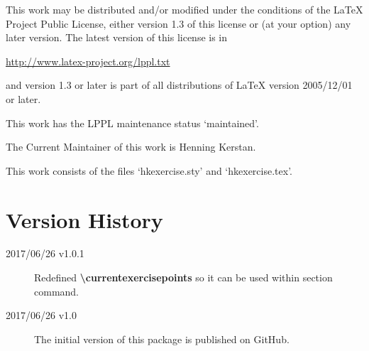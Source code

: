 \documentclass[
  twocolumn,%
  fontsize=9pt,%
  DIV=calc,%
  numbers=noendperiod%
]{scrartcl}
\begin{document}
\noindent This work may be distributed and/or modified under the conditions of the LaTeX Project Public License, either version 1.3 of this license or (at your option) any later version. The latest version of this license is in\medskip
 
   \url{http://www.latex-project.org/lppl.txt}\medskip
   
\noindent and version 1.3 or later is part of all distributions of LaTeX version 2005/12/01 or later.\medskip
 
 \noindent This work has the LPPL maintenance status `maintained'.\medskip
 
 \noindent The Current Maintainer of this work is Henning Kerstan.\medskip

 \noindent This work consists of the files `hkexercise.sty' and `hkexercise.tex'.


\section{Version History}
\begin{description}
\item[2017/06/26 v1.0.1] Redefined \textcolor{NavyBlue}{\ttfamily\bfseries\textbackslash currentexercisepoints} so it can be used within section command. 
\item[2017/06/26 v1.0] The initial version of this package is published on GitHub.
\end{description}
\end{document}
